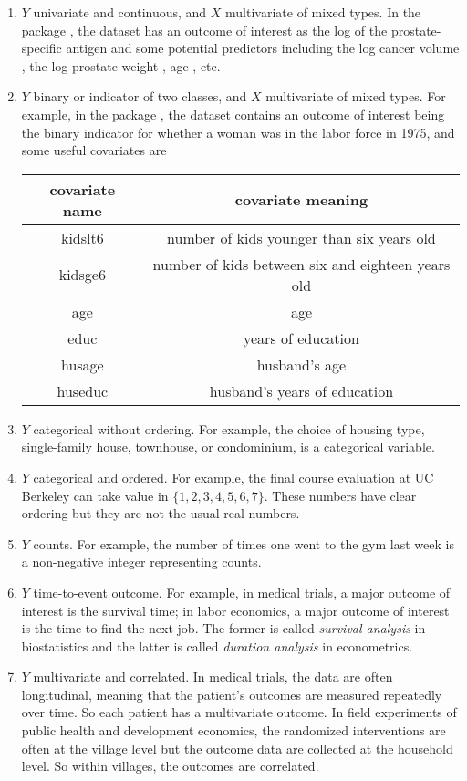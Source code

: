 \begin{enumerate}[(T1)]
\item $Y$ univariate and continuous, and $X$ multivariate of mixed types.
In the  package , the dataset 
has an outcome of interest as the log of the prostate-specific antigen and some potential predictors
including the log cancer volume , the log prostate weight , age , etc. 

 


\item $Y$ binary or indicator of two classes, and $X$ multivariate of
mixed types. For example, in the  package , the dataset  contains
an outcome of interest being the binary indicator for whether a woman
was in the labor force in 1975, and some useful covariates are

\begin{center}
\begin{tabular}{|c|c|}
\hline 
covariate name & covariate meaning\tabularnewline
\hline 
\hline 
kidslt6 & number of kids younger than six years old\tabularnewline
\hline 
kidsge6 & number of kids between six and eighteen years old\tabularnewline
\hline 
age & age\tabularnewline
\hline 
educ & years of education\tabularnewline
\hline 
husage & husband's age\tabularnewline
\hline 
huseduc & husband's years of education\tabularnewline
\hline 
\end{tabular} 
\end{center}


\item $Y$ categorical without ordering. For example, the choice of housing type, single-family house, townhouse, or condominium, is a categorical variable. 

\item $Y$ categorical and ordered. For example, the final course evaluation at UC Berkeley can take value in $\{ 1,2,3,4,5,6,7 \}$. These numbers have clear ordering but they are not the usual real numbers. 

\item $Y$ counts. For example, the number of times one went to the gym last week is a non-negative integer representing counts. 

\item $Y$ time-to-event outcome. For example, in medical trials, a major outcome of interest is the survival time; in labor economics, a major outcome of interest is the time to find the next job. The former is called {\it survival analysis} in biostatistics and the latter is called {\it duration analysis} in econometrics.


\item $Y$ multivariate and correlated. In medical trials, the data are often longitudinal, meaning that the patient's outcomes are measured repeatedly over time. So each patient has a multivariate outcome. In field experiments of public health and development economics, the randomized interventions are often at the village level but the outcome data are collected at the household level. So within villages, the outcomes are correlated. 


\end{enumerate}


